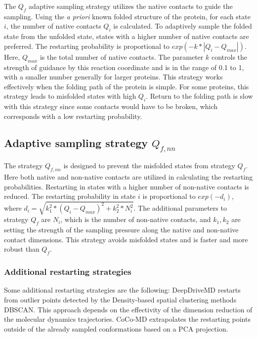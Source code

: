 The  $Q_{f}$ adaptive sampling strategy utilizes the native contacts to guide the sampling. Using the \emph{a priori} known folded structure of the protein, for each state $i$, the number of native contacts $Q_i$ is calculated. To adaptively sample the folded state from the unfolded state, states with a higher number of native contacts are preferred. The restarting probability is proportional to $exp( - k * | Q_i - Q_{max} | )$. Here, $Q_{max}$ is the total number of native contacts. The parameter $k$ controls the strength of guidance by this reaction coordinate and is in the range of 0.1 to 1, with a smaller number generally for larger proteins. This strategy works effectively when the folding path of the protein is simple. For some proteins, this strategy leads to misfolded states with high $Q_i$. Return to the folding path is slow with this strategy since some contacts would have to be broken, which corresponds with a low restarting probability.

\subsection{Adaptive sampling strategy $Q_{f,nn}$}

The strategy $Q_{f, nn}$ is designed to prevent the misfolded states from strategy $Q_{f}$.
Here both native and non-native contacts are utilized in calculating the restarting probabilities. Restarting in states with a higher number of non-native contacts is reduced.
The restarting probability in state $i$ is proportional to $exp(-d_i)$, where $d_i = \sqrt{k_1^2 * (Q_i - Q_{max})^2  + k_2^2 * N_i^2}$. 
The additional parameters to strategy $Q_{f}$ are $N_i$, which is the number of
non-native contacts, and $k_1, k_2$ are setting the strength of the sampling pressure along the native and non-native contact dimensions. This strategy avoids misfolded states and is faster and more robust than $Q_{f}$.

\subsubsection{Additional restarting strategies}
Some additional restarting strategies are the following:
DeepDriveMD\cite{leeDeepDriveMDDeepLearningDriven2019} restarts from outlier points detected by the Density-based spatial clustering methods DBSCAN. This approach depends on the effectivity of the dimension reduction of the molecular dynamics trajectories. CoCo-MD extrapolates the restarting points outside of the already sampled conformations based on a PCA projection\cite{shkurti2019jctc,harada2015jctc,harada2017jctc}.  

